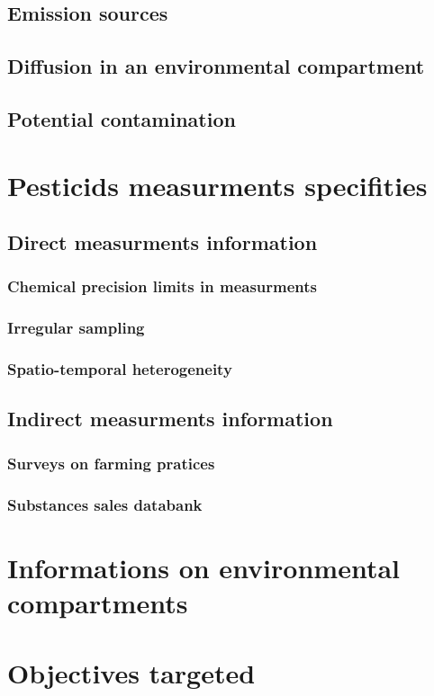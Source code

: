 \subsection{Emission sources}

\subsection{Diffusion in an environmental compartment}

\subsection{Potential contamination}

 

\section{Pesticids measurments specifities}\label{chp:2:3}

\subsection{Direct measurments information}

\subsubsection{Chemical precision limits in measurments}

\subsubsection{Irregular sampling}

\subsubsection{Spatio-temporal heterogeneity}

\subsection{Indirect measurments information}

\subsubsection{Surveys on farming pratices}

\subsubsection{Substances sales databank}



\section{Informations on environmental compartments}\label{chp:2:4}



\section{Objectives targeted}\label{chp:2:5}